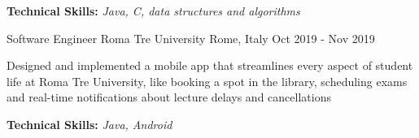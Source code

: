 \begin{cventries}
{\begin{cvitems}
        \item {\textbf{Technical Skills:} \textit{Java, C, data structures and algorithms}}
      \end{cvitems}
    }
  \cventry
    {Software Engineer} %
    {Roma Tre University} %
    {Rome, Italy} %
    {Oct 2019 - Nov 2019} %
    {
      \begin{cvitems} %
        \item {Designed and implemented a mobile app that streamlines every aspect of student life at Roma Tre University, like booking a spot in the library, scheduling exams and real-time notifications about lecture delays and cancellations}
        \item {\textbf{Technical Skills:} \textit{Java, Android}}
      \end{cvitems}
    }

\end{cventries}
